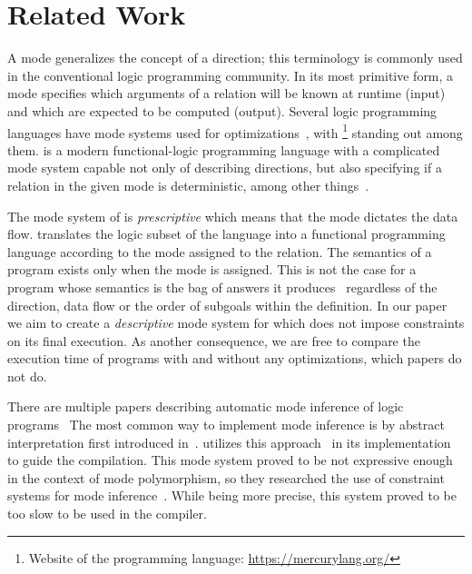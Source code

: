 \section{Related Work}
\label{sec:related}

A mode generalizes the concept of a direction; this terminology is commonly used in the conventional logic programming community.
In its most primitive form, a mode specifies which arguments of a relation will be known at runtime (input) and which are expected to be computed (output).
Several logic programming languages have mode systems used for optimizations~\cite{warren1977implementing, van1992high, thom1986nu}, with \merc\footnote{Website of the \merc programming language: \url{https://mercurylang.org/}} standing out among them.
\merc is a modern functional-logic programming language with a complicated mode system capable not only of describing directions, but also specifying if a relation in the given mode is deterministic, among other things~\cite{somogyi1987system,overton2002constraint}.

The mode system of \merc is \emph{prescriptive} which means that the mode dictates the data flow.
\merc translates the logic subset of the language into a functional programming language according to the mode assigned to the relation.
The semantics of a \merc program exists only when the mode is assigned.
This is not the case for a \mk program whose semantics is the bag of answers it produces~\cite{rozplokhas2020certified} regardless of the direction, data flow or the order of subgoals within the definition.
In our paper we aim to create a \emph{descriptive} mode system for \mk which does not impose constraints on its final execution.
As another consequence, we are free to compare the execution time of programs with and without any optimizations, which \merc papers do not do.

There are multiple papers describing automatic mode inference of logic programs~\cite{debray1988automatic, ridoux1999typed, smaus2000mode}
The most common way to implement mode inference is by abstract interpretation first introduced in~\cite{janssens1992deriving}.
\merc utilizes this approach~\cite{somogyi1987system} in its implementation to guide the compilation.
This mode system proved to be not expressive enough in the context of mode polymorphism, so they researched the use of constraint systems for mode inference~\cite{overton2002constraint}.
While being more precise, this system proved to be too slow to be used in the compiler.

